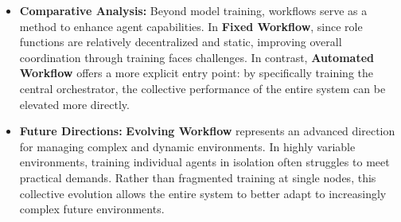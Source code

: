 \documentclass{llmxive}
\begin{document}
\begin{tcolorbox}[takeaway,title={Takeaway 6.2}]
\begin{itemize}
\item \textbf{Comparative Analysis:} Beyond model training, workflows serve as a method to enhance agent capabilities. In \textbf{Fixed Workflow}, since role functions are relatively decentralized and static, improving overall coordination through training faces challenges. In contrast, \textbf{Automated Workflow} offers a more explicit entry point: by specifically training the central orchestrator, the collective performance of the entire system can be elevated more directly.  

\item \textbf{Future Directions:} \textbf{Evolving Workflow} represents an advanced direction for managing complex and dynamic environments. In highly variable environments, training individual agents in isolation often struggles to meet practical demands. Rather than fragmented training at single nodes, this collective evolution allows the entire system to better adapt to increasingly complex future environments.
\end{itemize}
\end{tcolorbox}
\end{document}
